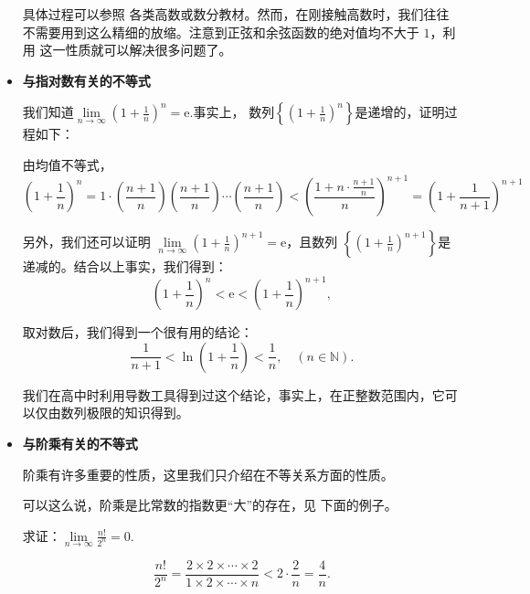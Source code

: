 \begin{itemize}
          具体过程可以参照%
          各类高数或数分教材。然而，在刚接触高数时，我们往往不需要用到这么精细的放缩。注意到正弦和余弦函数的绝对值均不大于 $1$，利用
          这一性质就可以解决很多问题了。

    \item \textbf{与指对数有关的不等式}

          我们知道$\lim\limits_{n \to \infty}\left (1+\frac{1}{n}\right )^n=\mathrm e$.事实上，
          数列$\left\{ \left (1+\frac{1}{n}\right )^n  \right\} $是递增的，证明过程如下：
          \begin{prove}
              由均值不等式，
              \begin{equation}
                  \left (1+\frac{1}{n}\right )^n=1\cdot \left (\frac{n+1}{n}\right )\left (\frac{n+1}{n}\right )
                  \cdots \left (\frac{n+1}{n}\right )<
                  \left (\frac{1+n\cdot \frac{n+1}{n}}{n}\right )^{n+1}=\left (1+\frac{1}{n+1}\right )^{n+1}\label{与指对数有关的不等式}
              \end{equation}
          \end{prove}


          另外，我们还可以证明 $\lim\limits_{n \to \infty}\left (1+\frac{1}{n}\right )^{n+1}=\mathrm e$，且数列
          $\left\{  \left (1+\frac{1}{n}\right )^{n+1} \right\}  $是递减的。结合以上事实，我们得到：
          \[
              \left (1+\frac{1}{n}\right )^n<\mathrm e<\left (1+\frac{1}{n}\right )^{n+1\!\!\!\!\!\!\!\!\!\!\!\!}
              ,\]


          取对数后，我们得到一个很有用的结论：
          \[
              \frac{1}{n+1}<\ln \left( 1+\frac{1}{n} \right) <\frac{1}{n}, \quad (n\in \mathbb{N} ).
          \]


          我们在高中时利用导数工具得到过这个结论，事实上，在正整数范围内，它可以仅由数列极限的知识得到。

    \item \textbf{与阶乘有关的不等式}

          阶乘有许多重要的性质，这里我们只介绍在不等关系方面的性质。

          可以这么说，阶乘是比常数的指数更“大”的存在，见     下面的例子。
          \begin{example}
              求证：$\lim\limits_{n \to \infty} \frac{n!}{2^n} =0$.
          \end{example}
          \begin{prove}
              \[
                  \frac{n!}{2^n}=\frac{2\times 2\times \cdots\times 2}{1\times 2\times \cdots\times n}
                  <2\cdot \frac{2}{n}=\frac{4}{n}
                  .\]


\end{prove}
\end{itemize}

